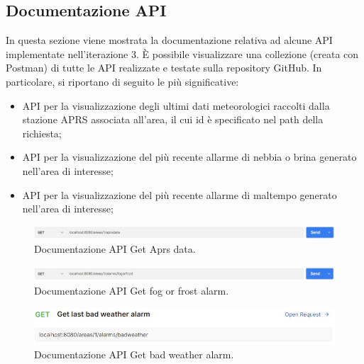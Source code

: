 \subsection{Documentazione API}

In questa sezione viene mostrata la documentazione relativa ad alcune API implementate nell'iterazione 3. \`E possibile visualizzare una collezione (creata con Postman) di tutte le API realizzate e testate sulla repository GitHub. In particolare, si riportano di seguito le più significative:
\begin{itemize}
	\item API per la visualizzazione degli ultimi dati meteorologici raccolti dalla stazione APRS associata all'area, il cui id è specificato nel path della richiesta;
	\item API per la visualizzazione del più recente allarme di nebbia o brina generato nell'area di interesse;
	\item API per la visualizzazione del più recente allarme di maltempo generato nell'area di interesse;
\end{itemize}

\begin{figure}[h!]
	\centering
	\includegraphics[width=1\linewidth]{./Iterazione 3/ImageFiles/GetAprsDataRequest}
	
	\caption{Documentazione API Get Aprs data.}
	\label{fig:GetAprsDataAPI}
\end{figure}

\begin{figure}[h!]
	\centering
	\includegraphics[width=1\linewidth]{./Iterazione 3/ImageFiles/GetFrostOrFogAlarmRequest}
	
	\caption{Documentazione API Get fog or frost alarm.}
	\label{fig:GetFrostOrFogAlarm}
\end{figure}

\begin{figure}[h!]
	\centering
	\includegraphics[width=1\linewidth]{./Iterazione 3/ImageFiles/GetBadWeatherAlarmRequest}
	
	\caption{Documentazione API Get bad weather alarm.}
	\label{fig:GetBadWeatherAlarm}
\end{figure}

\clearpage


